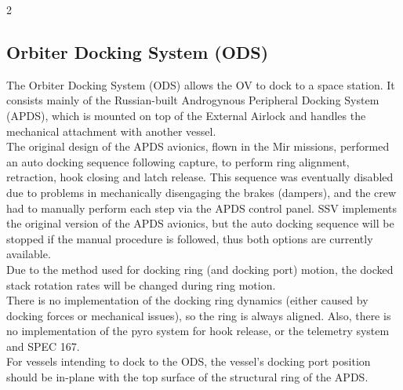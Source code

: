 \documentclass[Space_Shuttle_Vessel_Manual.tex]{subfiles}
\begin{document}
\begin{multicols*}{2}
\subsection{Orbiter Docking System (ODS)}
The Orbiter Docking System (ODS) allows the OV to dock to a space station. It consists mainly of the Russian-built Androgynous Peripheral Docking System (APDS), which is mounted on top of the External Airlock and handles the mechanical attachment with another vessel.\\
The original design of the APDS avionics, flown in the Mir missions, performed an auto docking sequence following capture, to perform ring alignment, retraction, hook closing and latch release. This sequence was eventually disabled due to problems in mechanically disengaging the brakes (dampers), and the crew had to manually perform each step via the APDS control panel. SSV implements the original version of the APDS avionics, but the auto docking sequence will be stopped if the manual procedure is followed, thus both options are currently available.\\
Due to the method used for docking ring (and docking port) motion, the docked stack rotation rates will be changed during ring motion.\\
There is no implementation of the docking ring dynamics (either caused by docking forces or mechanical issues), so the ring is always aligned. Also, there is no implementation of the pyro system for hook release, or the telemetry system and SPEC 167.\\
For vessels intending to dock to the ODS, the vessel's docking port position should be in-plane with the top surface of the structural ring of the APDS.\\
\newpage



\end{multicols*}
\end{document}
